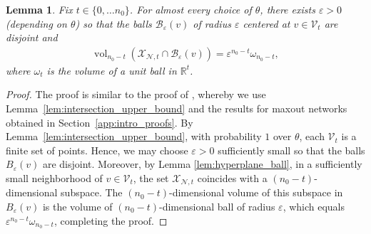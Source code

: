\documentclass{article}
\newtheorem{lemma}[theorem]{Lemma}
\theoremstyle{definition}
\newcommand{\net}{\mathcal{N}}
\newcommand{\nin}{n_0}
\newcommand{\vol}{\operatorname{vol}}
\begin{document}
\begin{lemma}
    \label{lem:intersection_volume}
    Fix $t \in \{0, \dots \nin \}$. For almost every choice of $\theta$, there exists $\varepsilon > 0$ (depending on $\theta$) so that the balls $\mathcal{B}_{\varepsilon}(v)$ of radius $\varepsilon$ centered at $v \in \mathcal{V}_t$ are disjoint and 
    \begin{align*}
        \vol_{\nin - t}(\mathcal{X}_{\net, t} \cap \mathcal{B}_{\varepsilon}(v)) = \varepsilon^{\nin - t} \omega_{\nin - t},
    \end{align*}
    where $\omega_t$ is the volume of a unit ball in $\mathbb{R}^t$.
\end{lemma}

\begin{proof}
    The proof is similar to the proof of \citet[Lemma~13]{NIPS2019_8328}, whereby we use Lemma~\ref{lem:intersection_upper_bound} and the results for maxout networks obtained in Section~\ref{app:intro_proofs}.
    By Lemma~\ref{lem:intersection_upper_bound}, with probability $1$ over $\theta$, each $\mathcal{V}_t$ is a finite set of points. 
    Hence, we may choose $\varepsilon > 0$ sufficiently small so that the balls $B_{\varepsilon}(v)$ are disjoint. Moreover, by Lemma \ref{lem:hyperplane_ball}, in a sufficiently small neighborhood of $v \in \mathcal{V}_t$, the set $\mathcal{X}_{\net, t}$ coincides with a $(\nin - t)$-dimensional subspace.
    The $(\nin - t)$-dimensional volume of this subspace in $B_{\varepsilon}(v)$ is the volume of $(\nin - t)$-dimensional ball of radius $\varepsilon$, which equals $\varepsilon^{\nin - t} \omega_{\nin - t}$, completing the proof.
\end{proof}
\end{document}
